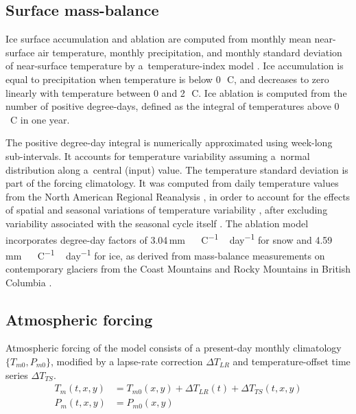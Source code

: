 \documentclass[tc, manuscript]{copernicus}
\begin{document}
\subsection{Surface mass-balance}

Ice surface accumulation and ablation are computed from monthly mean
near-surface air temperature, monthly precipitation, and monthly standard
deviation of near-surface temperature by a~temperature-index model
\citep[e.g.,][]{Hock.2003}. Ice accumulation is equal to precipitation
when temperature is below 0\,\unit{{\degree}C}, and decreases to zero linearly
with temperature between 0 and 2\,\unit{{\degree}C}. Ice ablation is computed
from the number of positive degree-days, defined as the integral of
temperatures above 0\,\unit{{\degree}C} in one year.

The positive degree-day integral \citep[Eqn.~6]{Calov.Greve.2005} is
numerically
approximated using week-long sub-intervals. It accounts for temperature
variability assuming a~normal distribution along a~central (input) value. The
temperature standard deviation is part of the forcing climatology. It was
computed from daily temperature values from the North American Regional
Reanalysis \citep[NARR,][]{Mesinger.etal.2006}, in order to account for the
effects of spatial and seasonal variations of temperature variability
\citep[Fig.~\ref{fig:atm};][]{Seguinot.2013}, after excluding variability
associated with the seasonal cycle itself \citep[cf.][]
{Seguinot.Rogozhina.2014}. The ablation model incorporates degree-day factors
of 3.04\,\unit{mm\,{\degree}C^{-1}\,day^{-1}} for snow and
4.59\,\unit{mm\,{\degree}C^{-1}\,day^{-1}} for ice, as derived from
mass-balance measurements on contemporary glaciers from the Coast Mountains and
Rocky Mountains in British Columbia \citep{Shea.etal.2009}.

\subsection{Atmospheric forcing}

Atmospheric forcing of the model consists of a present-day monthly climatology
$\{T_{m0}, P_{m0}\}$, modified by a lapse-rate correction ${\Delta}T_{LR}$ and
temperature-offset time series ${\Delta}T_{TS}$.
\begin{align}
    T_m(t, x, y) &= T_{m0}(x, y) + {\Delta}T_{LR}(t) + {\Delta}T_{TS}(t, x, y) \\
    P_m(t, x, y) &= P_{m0}(x, y)
\end{align}
\end{document}
